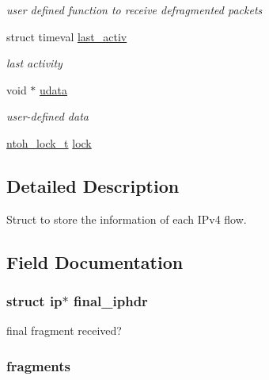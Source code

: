 \begin{DoxyCompactItemize}
\begin{DoxyCompactList}\small\item\em user defined function to receive defragmented packets \end{DoxyCompactList}\item 
struct timeval \hyperlink{structntoh__ipv4__flow__t_a9d115049a50ba4e69eb04c23c973a4a2}{last\-\_\-activ}
\begin{DoxyCompactList}\small\item\em last activity \end{DoxyCompactList}\item 
void $\ast$ \hyperlink{structntoh__ipv4__flow__t_a697ce711b67313990d351b5c95f87aed}{udata}
\begin{DoxyCompactList}\small\item\em user-\/defined data \end{DoxyCompactList}\item 
\hyperlink{structntoh__lock__t}{ntoh\-\_\-lock\-\_\-t} \hyperlink{structntoh__ipv4__flow__t_aad15823e4f2835531e6a02321cd53f7e}{lock}
\end{DoxyCompactItemize}


\subsection{Detailed Description}
Struct to store the information of each I\-Pv4 flow. 

\subsection{Field Documentation}
\hypertarget{structntoh__ipv4__flow__t_ac53ff70a1958fe8aea9dd55acb1792dd}{
\subsubsection[{final\-\_\-iphdr}]{\setlength{\rightskip}{0pt plus 5cm}struct ip$\ast$ final\-\_\-iphdr}}\label{structntoh__ipv4__flow__t_ac53ff70a1958fe8aea9dd55acb1792dd}


final fragment received? 

\hypertarget{structntoh__ipv4__flow__t_a54c94fcc5ec977612392fc7e3bec767f}{
\subsubsection[{fragments}]{ fragments}}\label{structntoh__ipv4__flow__t_a54c94fcc5ec977612392fc7e3bec767f}


